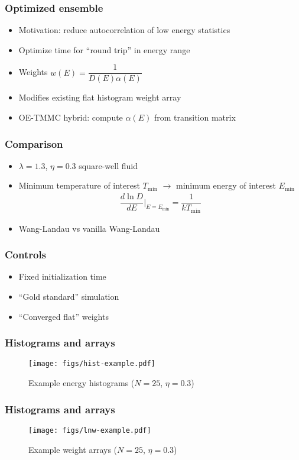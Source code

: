 \documentclass{beamer}
\newcommand{\p}[1]{\left(#1\right)} %
\newcommand{\f}[2]{\dfrac{#1}{#2}}
\renewcommand{\t}[1]{\text{#1}}
\let\olditem\item
\renewcommand{\item}{\setlength{\itemsep}{6pt}\olditem}
\begin{document}
\begin{frame}
  \frametitle{Optimized ensemble}
  \begin{itemize}
  \item Motivation: reduce autocorrelation of low energy statistics
  \item<2-> Optimize time for ``round trip'' in energy range
  \item<3-> Weights $w\p{E}=\f1{D\p{E}\alpha\p{E}}$
  \item<4-> Modifies existing flat histogram weight array
  \item<5> OE-TMMC hybrid: compute $\alpha\p{E}$ from transition matrix
  \end{itemize}
\end{frame}

\begin{frame}
  \frametitle{Comparison}
  \begin{itemize}
  \item $\lambda=1.3$, $\eta=0.3$ square-well fluid
  \item Minimum temperature of interest $T_{\t{min}}$ $\to$ minimum
    energy of interest $E_{\t{min}}$
    \begin{align*}
      \f{d\ln D}{dE}\bigg|_{E=E_{\t{min}}}=\f1{kT_{\t{min}}}
    \end{align*}
  \item Wang-Landau vs vanilla Wang-Landau
  \end{itemize}
\end{frame}

\begin{frame}
  \frametitle{Controls}
  \begin{itemize}
  \item Fixed initialization time
  \item ``Gold standard'' simulation
  \item ``Converged flat'' weights
  \end{itemize}
\end{frame}

\begin{frame}
  \frametitle{Histograms and arrays}
  \begin{figure}
    \centering
    \texttt{[image: figs/hist-example.pdf]}
    \caption{Example energy histograms ($N=25$, $\eta=0.3$)}
  \end{figure}
\end{frame}

\begin{frame}
  \frametitle{Histograms and arrays}
  \begin{figure}
    \centering
    \texttt{[image: figs/lnw-example.pdf]}
    \caption{Example weight arrays ($N=25$, $\eta=0.3$)}
  \end{figure}
\end{frame}
\end{document}
